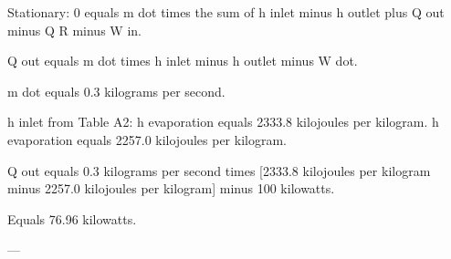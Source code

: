 Stationary:  
0 equals m dot times the sum of h inlet minus h outlet plus Q out minus Q R minus W in.  

Q out equals m dot times h inlet minus h outlet minus W dot.  

m dot equals 0.3 kilograms per second.  

h inlet from Table A2:  
h evaporation equals 2333.8 kilojoules per kilogram.  
h evaporation equals 2257.0 kilojoules per kilogram.  

Q out equals 0.3 kilograms per second times [2333.8 kilojoules per kilogram minus 2257.0 kilojoules per kilogram] minus 100 kilowatts.  

Equals 76.96 kilowatts.  

---